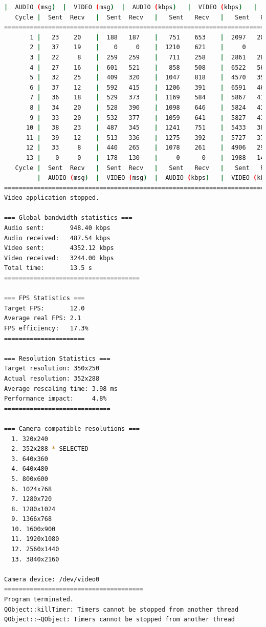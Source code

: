 \begin{lstlisting}[language=bash,basicstyle=\ttfamily\tiny]
         |  AUDIO (msg)  |  VIDEO (msg)  |  AUDIO (kbps)   |  VIDEO (kbps)   |     CPU (%) 
   Cycle |  Sent  Recv   |  Sent  Recv   |   Sent   Recv   |   Sent   Recv   | Program System
================================================================================================
       1 |   23    20    |  188   187    |   751    653    |  2097   2086    |  22      0       
       2 |   37    19    |    0     0    |  1210    621    |     0      0    |  34     80       
       3 |   22     8    |  259   259    |   711    258    |  2861   2856    |  33     79       
       4 |   27    16    |  601   521    |   858    508    |  6522   5653    |  23     76       
       5 |   32    25    |  409   320    |  1047    818    |  4570   3574    |  33     72       
       6 |   37    12    |  592   415    |  1206    391    |  6591   4623    |  39     71       
       7 |   36    18    |  529   373    |  1169    584    |  5867   4137    |  41     71       
       8 |   34    20    |  528   390    |  1098    646    |  5824   4300    |  41     71       
       9 |   33    20    |  532   377    |  1059    641    |  5827   4132    |  43     71       
      10 |   38    23    |  487   345    |  1241    751    |  5433   3845    |  37     77       
      11 |   39    12    |  513   336    |  1275    392    |  5727   3756    |  36     72       
      12 |   33     8    |  440   265    |  1078    261    |  4906   2954    |  32     72       
      13 |    0     0    |  178   130    |     0      0    |  1988   1451    |   3     46       
   Cycle |  Sent  Recv   |  Sent  Recv   |   Sent   Recv   |   Sent   Recv   | Program System
         |  AUDIO (msg)  |  VIDEO (msg)  |  AUDIO (kbps)   |  VIDEO (kbps)   |     CPU (%) 
===========================================================================================
Video application stopped.

=== Global bandwidth statistics ===
Audio sent:       948.40 kbps
Audio received:   487.54 kbps
Video sent:       4352.12 kbps
Video received:   3244.00 kbps
Total time:       13.5 s
=====================================

=== FPS Statistics ===
Target FPS:       12.0
Average real FPS: 2.1
FPS efficiency:   17.3%
======================

=== Resolution Statistics ===
Target resolution: 350x250
Actual resolution: 352x288
Average rescaling time: 3.98 ms
Performance impact:     4.8%
=============================

=== Camera compatible resolutions ===
  1. 320x240
  2. 352x288 * SELECTED
  3. 640x360
  4. 640x480
  5. 800x600
  6. 1024x768
  7. 1280x720
  8. 1280x1024
  9. 1366x768
  10. 1600x900
  11. 1920x1080
  12. 2560x1440
  13. 3840x2160

Camera device: /dev/video0
======================================
Program terminated.
QObject::killTimer: Timers cannot be stopped from another thread
QObject::~QObject: Timers cannot be stopped from another thread
\end{lstlisting}

